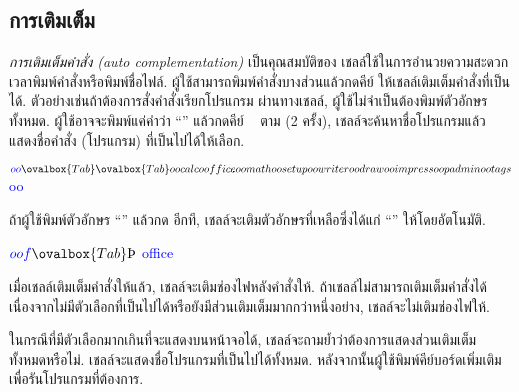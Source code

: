 \begin{thwbr}
\subsection{การเติมเต็ม}
\emph{การเติมเต็มคำสั่ง (auto complementation)} เป็นคุณสมบัติของ  เชลล์ใช้ในการอำนวยความสะดวกเวลาพิมพ์คำสั่งหรือพิมพ์ชื่อไฟล์. ผู้ใช้สามารถพิมพ์คำสั่งบางส่วนแล้วกดคีย์  ให้เชลล์เติมเต็มคำสั่งที่เป็นได้. ตัวอย่างเช่นถ้าต้องการสั่งคำสั่งเรียกโปรแกรม  ผ่านทางเชลล์, ผู้ใช้ไม่จำเป็นต้องพิมพ์ตัวอักษรทั้งหมด. ผู้ใช้อาจจะพิมพ์แค่คำว่า ``'' แล้วกดคีย์ {\latintext\tt{} } ตาม (2 ครั้ง), เชลล์จะค้นหาชื่อโปรแกรมแล้วแสดงชื่อคำสั่ง (โปรแกรม) ที่เป็นไปได้ให้เลือก. 
\begin{MyExample}
\begin{MyEx}
$ \textcolor{blue}{oo}\ovalbox{Tab}\ovalbox{Tab}
oocalc     ooffice    oomath     oosetup    oowriter   
oodraw     ooimpress  oopadmin   ootags     
$ \textcolor{blue}{oo}\cursorprompt
\end{MyEx}
\end{MyExample}
ถ้าผู้ใช้พิมพ์ตัวอักษร ``'' แล้วกด {\latintext\tt{}} อีกที, เชลล์จะเติมตัวอักษรที่เหลือซึ่งได้แก่ ``'' ให้โดยอัตโนมัติ. 
\begin{MyExample}
\begin{MyEx}
$ \textcolor{blue}{oof}\ovalbox{Tab} \Pisymbol{psy}{222} $ \textcolor{blue}{office} \cursorprompt
\end{MyEx}
\end{MyExample}
เมื่อเชลล์เติมเต็มคำสั่งให้แล้ว, เชลล์จะเติมช่องไฟหลังคำสั่งให้. ถ้าเชลล์ไม่สามารถเติมเต็มคำสั่งได้เนื่องจากไม่มีตัวเลือกที่เป็นไปได้หรือยังมีส่วนเติมเต็มมากกว่าหนึ่งอย่าง, เชลล์จะไม่เติมช่องไฟให้. 

ในกรณีที่มีตัวเลือกมากเกินที่จะแสดงบนหน้าจอได้, เชลล์จะถามย้ำว่าต้องการแสดงส่วนเติมเต็มทั้งหมดหรือไม่. เชลล์จะแสดงชื่อโปรแกรมที่เป็นไปได้ทั้งหมด. หลังจากนั้นผู้ใช้พิมพ์คีย์บอร์ดเพิ่มเติมเพื่อรันโปรแกรมที่ต้องการ.


\end{thwbr}
